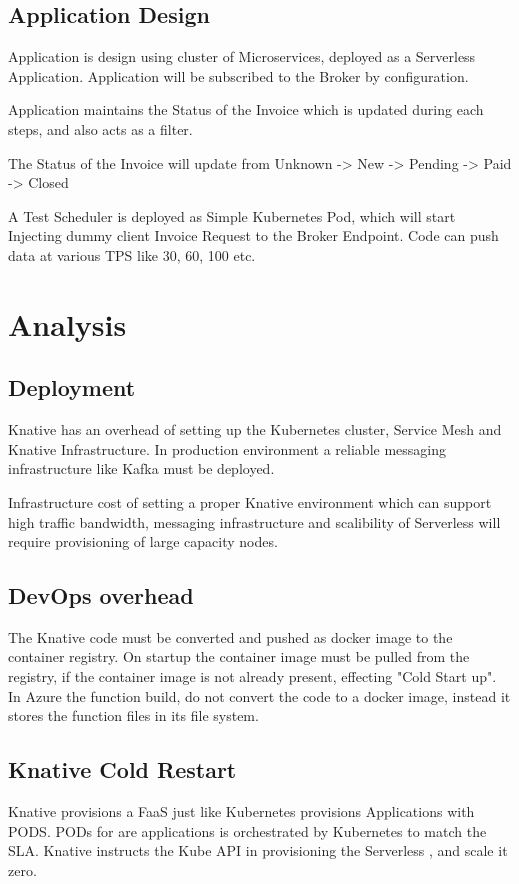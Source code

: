 \documentclass[12pt]{article}
\begin{document}
\begin{flushleft}
\begin{figure}
\end{figure}


\subsection{Application Design}
Application is design using cluster of Microservices, deployed as a Serverless Application. 
Application will be subscribed to the Broker by configuration.

Application maintains the Status of the Invoice which is updated during each steps, and also acts as a filter.

The Status of the Invoice will update from Unknown -> New -> Pending -> Paid -> Closed

A Test Scheduler is deployed as Simple Kubernetes Pod, which will start Injecting dummy client Invoice Request to the Broker Endpoint. Code can push data at various TPS like 30, 60, 100 etc.


\section{Analysis}
\subsection{Deployment}
Knative has an overhead of setting up the Kubernetes cluster, Service Mesh and Knative Infrastructure. In production environment a reliable messaging infrastructure like Kafka must be deployed.

Infrastructure cost of setting a proper Knative environment which can support high traffic bandwidth, messaging infrastructure and scalibility of Serverless will require provisioning of large capacity nodes.

\subsection{DevOps overhead}
The Knative code must be converted and pushed as docker image to the container registry. 
On startup the container image must be pulled from the registry, if the container image is not already present, effecting "Cold Start up". 
In Azure the function build, do not convert the code to a docker image, instead it stores the function files in its file system.

\subsection{Knative Cold Restart}
Knative provisions a FaaS just like Kubernetes  provisions Applications with PODS. PODs for are applications is orchestrated by Kubernetes to match the SLA. Knative instructs the Kube API in provisioning the Serverless , and scale it zero.  


\end{flushleft}
\end{document}
